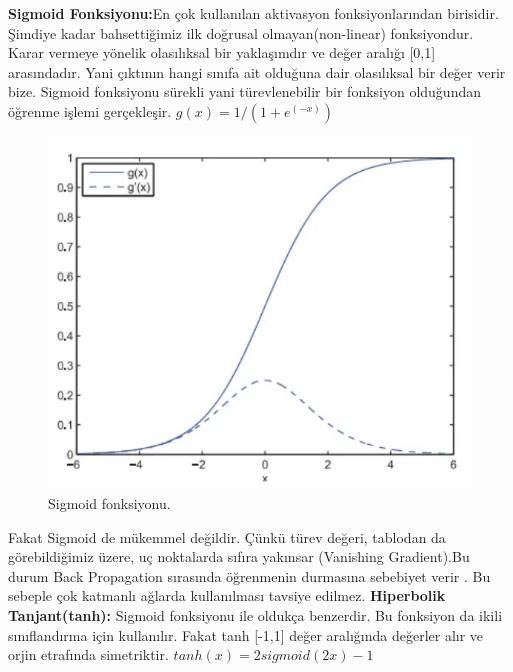 \documentclass[12pt, a4paper]{article}
\begin{document}
	\newline \textbf{Sigmoid Fonksiyonu:}En çok kullanılan aktivasyon fonksiyonlarından birisidir. Şimdiye kadar bahsettiğimiz ilk doğrusal olmayan(non-linear) fonksiyondur. Karar vermeye yönelik olasılıksal bir yaklaşımdır ve değer aralığı [0,1] arasındadır. Yani çıktının hangi sınıfa ait olduğuna dair olasılıksal bir değer verir bize. Sigmoid fonksiyonu sürekli yani türevlenebilir bir fonksiyon olduğundan öğrenme işlemi gerçekleşir.
	\newline $ g(x) = 1/(1+e^(-x)) $
	
	\begin{figure}[!h]
		\centering
		\includegraphics{6.3.png}
		\caption{Sigmoid fonksiyonu.}
	\end{figure}
	\newpage Fakat Sigmoid de mükemmel değildir. Çünkü türev değeri, tablodan da görebildiğimiz üzere, uç noktalarda sıfıra yakınsar (Vanishing Gradient).Bu durum Back Propagation sırasında öğrenmenin durmasına sebebiyet verir . Bu sebeple çok katmanlı ağlarda kullanılması tavsiye edilmez.
	\newline \textbf{Hiperbolik Tanjant(tanh):} Sigmoid fonksiyonu ile oldukça benzerdir. Bu fonksiyon da ikili sınıflandırma için kullanılır. Fakat tanh [-1,1] değer aralığında değerler alır ve orjin etrafında simetriktir.
	\newline $tanh(x) = 2sigmoid(2x)-1$
\end{document}
